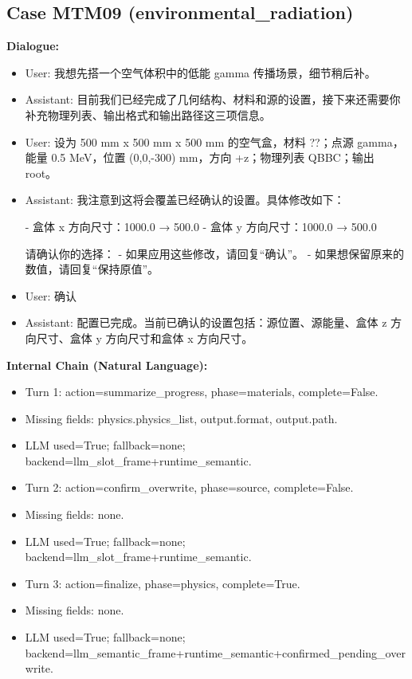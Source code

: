 \documentclass[11pt]{ctexart}
\begin{document}
\subsection{Case MTM09 (environmental\_radiation)}
\textbf{Dialogue:}
\begin{itemize}
\item User: 我想先搭一个空气体积中的低能 gamma 传播场景，细节稍后补。
\item Assistant: 目前我们已经完成了几何结构、材料和源的设置，接下来还需要你补充物理列表、输出格式和输出路径这三项信息。
\item User: 设为 500 mm x 500 mm x 500 mm 的空气盒，材料 ??；点源 gamma，能量 0.5 MeV，位置 (0,0,-300) mm，方向 +z；物理列表 QBBC；输出 root。
\item Assistant: 我注意到这将会覆盖已经确认的设置。具体修改如下：

- 盒体 x 方向尺寸：1000.0 → 500.0
- 盒体 y 方向尺寸：1000.0 → 500.0

请确认你的选择：
- 如果应用这些修改，请回复“确认”。
- 如果想保留原来的数值，请回复“保持原值”。
\item User: 确认
\item Assistant: 配置已完成。当前已确认的设置包括：源位置、源能量、盒体 z 方向尺寸、盒体 y 方向尺寸和盒体 x 方向尺寸。
\end{itemize}
\textbf{Internal Chain (Natural Language):}
\begin{itemize}
\item Turn 1: action=summarize\_progress, phase=materials, complete=False.
\item Missing fields: physics.physics\_list, output.format, output.path.
\item LLM used=True; fallback=none; backend=llm\_slot\_frame+runtime\_semantic.
\item Turn 2: action=confirm\_overwrite, phase=source, complete=False.
\item Missing fields: none.
\item LLM used=True; fallback=none; backend=llm\_slot\_frame+runtime\_semantic.
\item Turn 3: action=finalize, phase=physics, complete=True.
\item Missing fields: none.
\item LLM used=True; fallback=none; backend=llm\_semantic\_frame+runtime\_semantic+confirmed\_pending\_overwrite.
\end{itemize}
\end{document}
